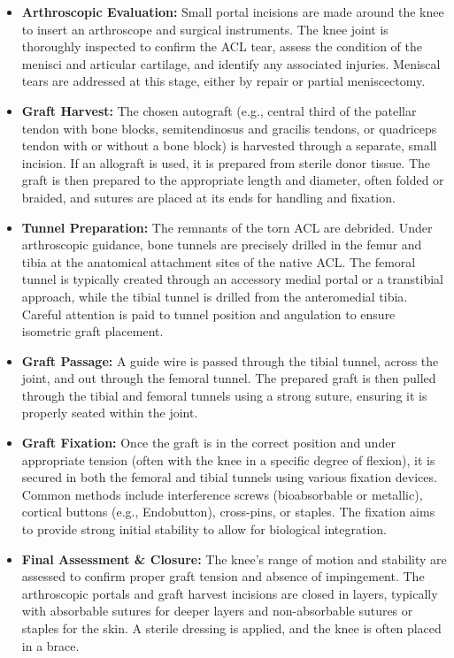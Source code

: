 \begin{itemize}
  \item \textbf{Arthroscopic Evaluation:} Small portal incisions are made around the knee to insert an arthroscope and surgical instruments. The knee joint is thoroughly inspected to confirm the ACL tear, assess the condition of the menisci and articular cartilage, and identify any associated injuries. Meniscal tears are addressed at this stage, either by repair or partial meniscectomy.
  
  \item \textbf{Graft Harvest:} The chosen autograft (e.g., central third of the patellar tendon with bone blocks, semitendinosus and gracilis tendons, or quadriceps tendon with or without a bone block) is harvested through a separate, small incision. If an allograft is used, it is prepared from sterile donor tissue. The graft is then prepared to the appropriate length and diameter, often folded or braided, and sutures are placed at its ends for handling and fixation.
  
  \item \textbf{Tunnel Preparation:} The remnants of the torn ACL are debrided. Under arthroscopic guidance, bone tunnels are precisely drilled in the femur and tibia at the anatomical attachment sites of the native ACL. The femoral tunnel is typically created through an accessory medial portal or a transtibial approach, while the tibial tunnel is drilled from the anteromedial tibia. Careful attention is paid to tunnel position and angulation to ensure isometric graft placement.
  
  \item \textbf{Graft Passage:} A guide wire is passed through the tibial tunnel, across the joint, and out through the femoral tunnel. The prepared graft is then pulled through the tibial and femoral tunnels using a strong suture, ensuring it is properly seated within the joint.
  
  \item \textbf{Graft Fixation:} Once the graft is in the correct position and under appropriate tension (often with the knee in a specific degree of flexion), it is secured in both the femoral and tibial tunnels using various fixation devices. Common methods include interference screws (bioabsorbable or metallic), cortical buttons (e.g., Endobutton), cross-pins, or staples. The fixation aims to provide strong initial stability to allow for biological integration.
  
  \item \textbf{Final Assessment \& Closure:} The knee's range of motion and stability are assessed to confirm proper graft tension and absence of impingement. The arthroscopic portals and graft harvest incisions are closed in layers, typically with absorbable sutures for deeper layers and non-absorbable sutures or staples for the skin. A sterile dressing is applied, and the knee is often placed in a brace.
\end{itemize}

